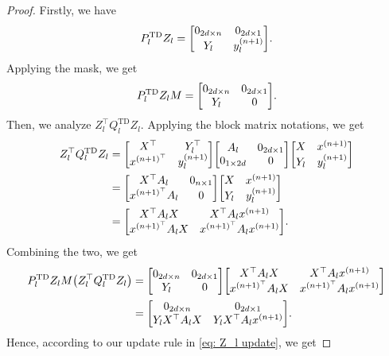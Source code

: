 \documentclass{article}
\newcommand{\td}{\text{TD}}
\begin{document}
\begin{proof}
    Firstly, we have
    \begin{align}
        P_l^{\td} Z_l = \mqty[0_{2d \times n} & 0_{2d \times 1}\\
                        Y_l & y_l^{(n+1)}].
    \end{align}
    Applying the mask, we get
    \begin{align}
        P_l^{\td} Z_l M = \mqty[0_{2d \times n} & 0_{2d \times 1}\\
                        Y_l & 0].
    \end{align}
    Then, we analyze $Z_l^\top Q_l^{\td} Z_l$.
    Applying the block matrix notations, we get
    \begin{align}
        Z_l^\top Q_l^{\td} Z_l &= \mqty[X^\top & Y_l^\top\\
                                 x^{(n+1)^\top} & y_l^{(n+1)}]
                           \mqty[A_l & 0_{2d \times 1} \\
                                 0_{1 \times 2d} & 0]
                            \mqty[X & x^{(n+1)} \\
                                  Y_l & y_l^{(n+1)}]\\
                        &= \mqty[X^\top A_l & 0_{n \times 1}\\
                                 x^{(n+1)^\top} A_l & 0]
                           \mqty[X & x^{(n+1)} \\
                                  Y_l & y_l^{(n+1)}]\\
                        &= \mqty[X^\top A_l X & X^\top A_l x^{(n+1)}\\
                                 x^{(n+1)^\top} A_l X & x^{(n+1)^\top} A_l x^{(n+1)}].
    \end{align}
    Combining the two, we get
    \begin{align}
        P_l^{\td} Z_l M \qty(Z_l^\top Q_l^{\td} Z_l)
        &= \mqty[0_{2d \times n} & 0_{2d \times 1}\\
                        Y_l & 0]
            \mqty[X^\top A_l X & X^\top A_l x^{(n+1)}\\
                                 x^{(n+1)^\top} A_l X & x^{(n+1)^\top} A_l x^{(n+1)}]\\
        &= \mqty[0_{2d \times n} & 0_{2d \times 1}\\
                 Y_l X^\top A_l X & Y_l X^\top A_l x^{(n+1)}].
    \end{align}
    Hence, according to our update rule in \eqref{eq: Z_l update}, we get

\end{proof}
\end{document}
